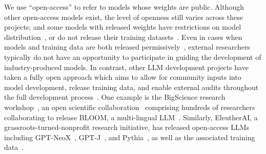 \documentclass[10pt]{article} %
\begin{document}
We use ``open-access'' to refer to models whose weights are public. Although other open-access models exist, the level of openness still varies across these projects;  
and some models with released weights have restrictions on model distribution~\citep{touvron2023llama}, or do not release their training datasets~\citep{nijkamp:codegen,zhang2022opt,fried2022incoder}. Even in cases when models and training data are both released permissively~\citep{raffel2020exploring,tay2022unifying}, external researchers typically do not have an opportunity to participate in guiding the development of industry-produced models. %
In contrast, other LLM development projects have taken a fully open approach
which aims to allow for community inputs into model development, release training data, and enable external audits throughout the full development process~\citep{solaiman2023gradient}. 
One example is the 
BigScience research workshop~\citep{bigscience_workshop_2022}, an open scientific collaboration~\citep{akiki-bigscience-22} comprising hundreds of researchers 
collaborating to release 
BLOOM, a multi-lingual LLM~\citep{scao2022bloom,muennighoff2022crosslingual}. Similarly, EleutherAI, a grassroots-turned-nonprofit research initiative, has released open-access LLMs including GPT-NeoX~\citep{black2022gpt}, GPT-J~\citep{wang2021gpt}, and Pythia~\citep{biderman2023pythia}, as well as the associated training data~\citep{gao2020pile}. 

\end{document}
